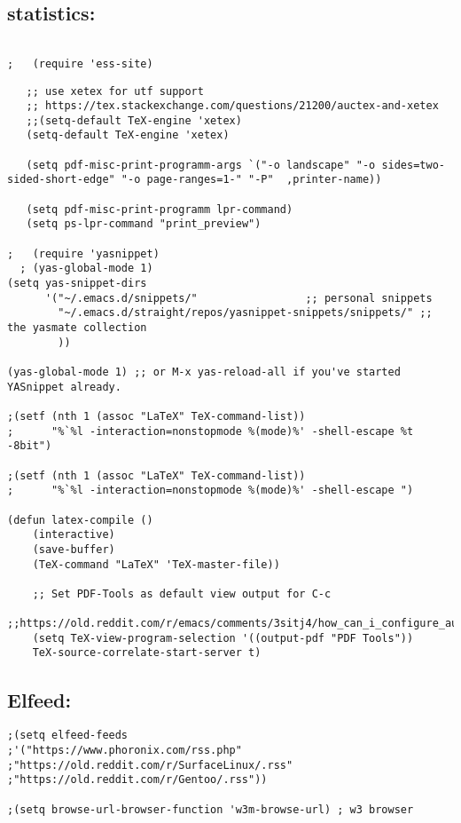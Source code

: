 \documentclass[11pt]{article}
\begin{document}
\subsection{statistics:}
\label{sec:orgcea4799}
\begin{verbatim}

;   (require 'ess-site)

\end{verbatim}
\begin{verbatim}
   ;; use xetex for utf support
   ;; https://tex.stackexchange.com/questions/21200/auctex-and-xetex
   ;;(setq-default TeX-engine 'xetex)
   (setq-default TeX-engine 'xetex)

   (setq pdf-misc-print-programm-args `("-o landscape" "-o sides=two-sided-short-edge" "-o page-ranges=1-" "-P"  ,printer-name))

   (setq pdf-misc-print-programm lpr-command)
   (setq ps-lpr-command "print_preview")

;   (require 'yasnippet)
  ; (yas-global-mode 1)
(setq yas-snippet-dirs
      '("~/.emacs.d/snippets/"                 ;; personal snippets
        "~/.emacs.d/straight/repos/yasnippet-snippets/snippets/" ;; the yasmate collection
        ))

(yas-global-mode 1) ;; or M-x yas-reload-all if you've started YASnippet already.

;(setf (nth 1 (assoc "LaTeX" TeX-command-list))
;      "%`%l -interaction=nonstopmode %(mode)%' -shell-escape %t -8bit")

;(setf (nth 1 (assoc "LaTeX" TeX-command-list))
;      "%`%l -interaction=nonstopmode %(mode)%' -shell-escape ")

(defun latex-compile ()
    (interactive)
    (save-buffer)
    (TeX-command "LaTeX" 'TeX-master-file))

    ;; Set PDF-Tools as default view output for C-c
    ;;https://old.reddit.com/r/emacs/comments/3sitj4/how_can_i_configure_auctex_to_set_pdftools_as_the/
    (setq TeX-view-program-selection '((output-pdf "PDF Tools"))
    TeX-source-correlate-start-server t)

\end{verbatim}
\subsection{Elfeed:}
\label{sec:org10956bc}
\begin{verbatim}
;(setq elfeed-feeds
;'("https://www.phoronix.com/rss.php"
;"https://old.reddit.com/r/SurfaceLinux/.rss"
;"https://old.reddit.com/r/Gentoo/.rss"))

;(setq browse-url-browser-function 'w3m-browse-url) ; w3 browser
\end{verbatim}
\end{document}
